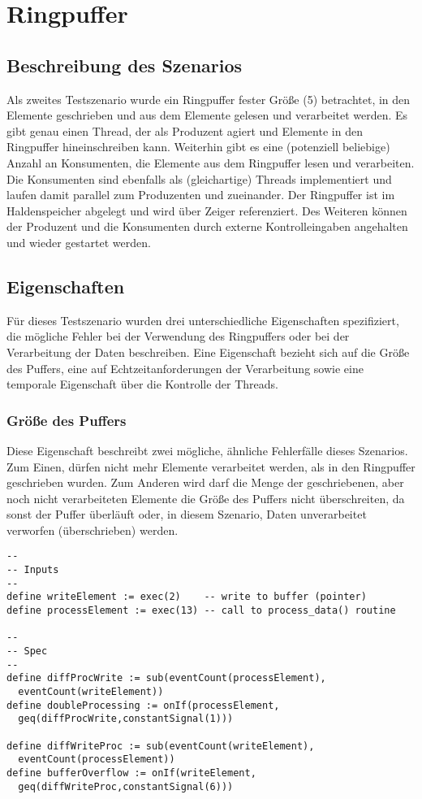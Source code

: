 \documentclass{article}
\begin{document}
\section{Ringpuffer}

\subsection{Beschreibung des Szenarios}

Als zweites Testszenario wurde ein Ringpuffer fester Größe (5) betrachtet, in den Elemente geschrieben und aus dem Elemente gelesen und verarbeitet werden. Es gibt genau einen Thread, der als Produzent agiert und Elemente in den Ringpuffer hineinschreiben kann.
Weiterhin gibt es eine (potenziell beliebige) Anzahl an Konsumenten, die Elemente aus dem Ringpuffer lesen und verarbeiten. Die Konsumenten sind ebenfalls als (gleichartige) Threads implementiert und laufen damit parallel zum Produzenten und zueinander.
Der Ringpuffer ist im Haldenspeicher abgelegt und wird über Zeiger referenziert.
Des Weiteren können der Produzent und die Konsumenten durch externe Kontrolleingaben angehalten und wieder gestartet werden.

\subsection{Eigenschaften}

Für dieses Testszenario wurden drei unterschiedliche Eigenschaften spezifiziert, die mögliche Fehler bei der Verwendung des Ringpuffers oder bei der Verarbeitung der Daten beschreiben. Eine Eigenschaft bezieht sich auf die Größe des Puffers, eine auf Echtzeitanforderungen der Verarbeitung sowie eine temporale Eigenschaft über die Kontrolle der Threads.

\subsubsection{Größe des Puffers}

Diese Eigenschaft beschreibt zwei mögliche, ähnliche Fehlerfälle dieses Szenarios. Zum Einen,
dürfen nicht mehr Elemente verarbeitet werden, als in den Ringpuffer geschrieben wurden.
Zum Anderen wird darf die Menge der geschriebenen, aber noch nicht verarbeiteten Elemente die Größe des Puffers nicht überschreiten, da sonst der Puffer überläuft oder, in diesem Szenario, Daten unverarbeitet verworfen (überschrieben) werden.

\begin{lstlisting}[language=tessla+salt]
--
-- Inputs
--
define writeElement := exec(2)    -- write to buffer (pointer)
define processElement := exec(13) -- call to process_data() routine

--
-- Spec
--
define diffProcWrite := sub(eventCount(processElement),
  eventCount(writeElement))
define doubleProcessing := onIf(processElement,
  geq(diffProcWrite,constantSignal(1)))

define diffWriteProc := sub(eventCount(writeElement),
  eventCount(processElement))
define bufferOverflow := onIf(writeElement,
  geq(diffWriteProc,constantSignal(6)))
\end{lstlisting}
\end{document}
